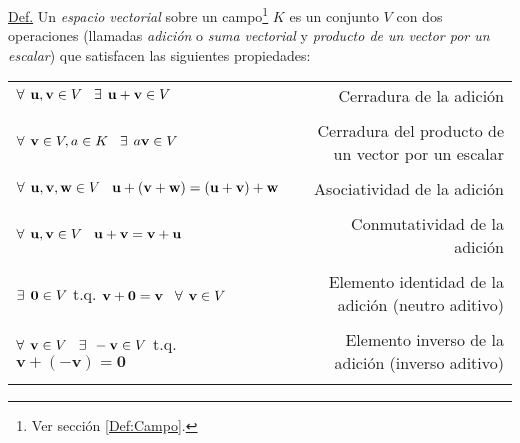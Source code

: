 \documentclass[12pt]{article}
\begin{document}
\begin{tcolorbox}
\underline{Def.} Un \textit{espacio vectorial} sobre un campo\footnote{Ver sección \ref{Def:Campo}.} $K$ es un conjunto $V$ con dos operaciones (llamadas \textit{adición} o \textit{suma vectorial} y \textit{producto de un vector por un escalar}) que satisfacen las siguientes propiedades:

\begin{center}
\begin{tabular}{lr}
    $\forall\hspace{1.5mm} \mathbf{u},\mathbf{v}\in V \hspace{3mm}\exists \hspace{1.5mm} \mathbf{u}+\mathbf{v}\in V$ & Cerradura de la adición \\ \\ \multirow{2}{0.4\textwidth}{$\forall\hspace{1.5mm} \mathbf{v}\in V, a\in K \hspace{3mm}\exists \hspace{1.5mm} a\mathbf{v}\in V$} & \multirow{2}{0.28\textwidth}{Cerradura del producto de un vector por un escalar} \\ \\ \\
    $\forall\hspace{1.5mm} \mathbf{u},\mathbf{v},\mathbf{w}\in V\hspace{3mm}\mathbf{u}+(\mathbf{v}+\mathbf{w})=(\mathbf{u}+\mathbf{v})+\mathbf{w}$  & Asociatividad de la adición\\ \\
    $\forall\hspace{1.5mm} \mathbf{u},\mathbf{v}\in V\hspace{3mm}\mathbf{u}+\mathbf{v}=\mathbf{v}+\mathbf{u}$ & Conmutatividad de la adición \\ \\
    $\exists \hspace{1.5mm} \mathbf{0}\in V$ t.q. $\mathbf{v}+\mathbf{0}=\mathbf{v}\hspace{3mm}\forall\hspace{1.5mm} \mathbf{v} \in V$ & Elemento identidad de la adición (neutro aditivo) \\ \\
    $\forall\hspace{1.5mm}\mathbf{v}\in V \hspace{3mm}\exists\hspace{1.5mm} -\mathbf{v}\in V$ t.q. $\mathbf{v}+(-\mathbf{v})=\mathbf{0}$ & Elemento inverso de la adición (inverso aditivo) \\ \\

\end{tabular}
\end{center}
\end{tcolorbox}
\end{document}
